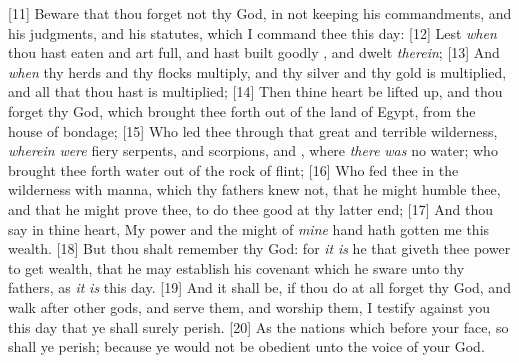[11] \textcolor[cmyk]{0.99998,1,0,0}{Beware that thou forget not    thy God, in not keeping his commandments, and his judgments, and his statutes, which I command thee this day:}
[12] \textcolor[cmyk]{0.99998,1,0,0}{Lest \emph{when} thou hast eaten and art full, and hast built goodly , and dwelt \emph{therein};}
[13] \textcolor[cmyk]{0.99998,1,0,0}{And \emph{when} thy herds and thy flocks multiply, and thy silver and thy gold is multiplied, and all that thou hast is multiplied;}
[14] \textcolor[cmyk]{0.99998,1,0,0}{Then thine heart be lifted up, and thou forget    thy God, which brought thee forth out of the land of Egypt, from the house of bondage;}
[15] \textcolor[cmyk]{0.99998,1,0,0}{Who led thee through that great and terrible wilderness, \emph{wherein} \emph{were} fiery serpents, and scorpions, and , where \emph{there} \emph{was} no water; who brought thee forth water out of the rock of flint;}
[16] \textcolor[cmyk]{0.99998,1,0,0}{Who fed thee in the wilderness with manna, which thy fathers knew not, that he might humble thee, and that he might prove thee, to do thee good at thy latter end;}
[17] \textcolor[cmyk]{0.99998,1,0,0}{And thou say in thine heart, My power and the might of \emph{mine} hand hath gotten me this wealth.}
[18] \textcolor[cmyk]{0.99998,1,0,0}{But thou shalt remember    thy God: for \emph{it} \emph{is} he that giveth thee power to get wealth, that he may establish his covenant which he sware unto thy fathers, as \emph{it} \emph{is} this day.}
[19] \textcolor[cmyk]{0.99998,1,0,0}{And it shall be, if thou do at all forget    thy God, and walk after other gods, and serve them, and worship them, I testify against you this day that ye shall surely perish.}
[20] \textcolor[cmyk]{0.99998,1,0,0}{As the nations which     before your face, so shall ye perish; because ye would not be obedient unto the voice of    your God.}